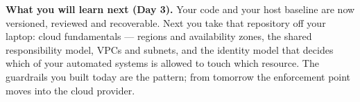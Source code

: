 \begin{keyidea}
\textbf{What you will learn next (Day 3).} Your code and your host baseline are now versioned, reviewed and recoverable. Next you take that repository off your laptop: cloud fundamentals --- regions and availability zones, the shared responsibility model, VPCs and subnets, and the identity model that decides which of your automated systems is allowed to touch which resource. The guardrails you built today are the pattern; from tomorrow the enforcement point moves into the cloud provider.
\end{keyidea}
